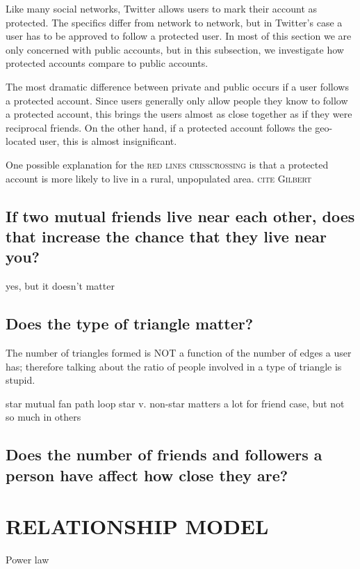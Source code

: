 \documentclass{sig-alternate}
\begin{document}
Like many social networks, Twitter allows users to mark their account as protected. The specifics differ from network to network, but in Twitter's case a user has to be approved to follow a protected user.
In most of this section we are only concerned with public accounts, but in this subsection, we investigate how protected accounts compare to public accounts.

The most dramatic difference between private and public occurs if a user follows a protected account.
Since users generally only allow people they know to follow a protected account, this brings the users almost as close together as if they were reciprocal friends. On the other hand, if a protected account follows the geo-located user, this is almost insignificant.

One possible explanation for the \textsc{red lines crisscrossing} is that a protected account is more likely to live in a rural, unpopulated area. \textsc{cite Gilbert}

\subsection{If two mutual friends live near each other, does that increase the chance that they live near you?}
yes, but it doesn't matter

\subsection{Does the type of triangle matter?}

The number of triangles formed is NOT a function of the number of edges a user has; therefore talking about the ratio of people involved in a type of triangle is stupid.

star
mutual fan
path
loop 
star v. non-star matters a lot for friend case, but not so much in others



\subsection{Does the number of friends and followers a person have affect how close they are?}


\section{RELATIONSHIP MODEL}
\label{sec:model}

Power law
\begin{figure}
\centering
{}
\caption{}
\label{fig:EdgeTypesMdist}
\end{figure}
\end{document}
